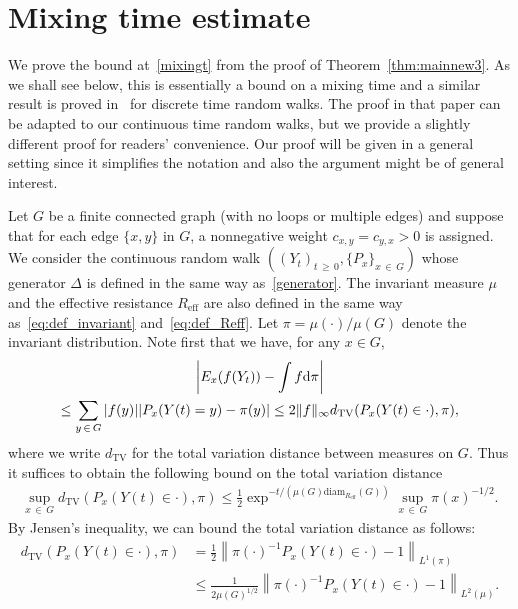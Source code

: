 \documentclass[AHL,Unicode,longabstracts,published]{cedram}
\newcommand{\dd}{\text{\upshape{d}}}
\begin{document}
\section{Mixing time estimate}\label{app:mixingt}

We prove the bound at~\eqref{mixingt} from the proof of Theorem~\ref{thm:mainnew3}. As we shall see below, this is essentially a bound on a mixing time and a similar result is proved in~\cite[Lemma~4.1, Corollary~4.2]{NP08} for discrete time random walks. The proof in that paper can be adapted to our continuous time random walks, but we provide a slightly different proof for readers' convenience. Our proof will be given in a general setting since it simplifies the notation and also the argument might be of general interest.

Let $G$ be a finite connected graph (with no loops or multiple edges) and suppose that for each edge $\{x,y\}$ in $G$, a nonnegative weight $c_{x,y}=c_{y,x}> 0$ is assigned. We consider the continuous random walk $((Y_t)_{t\,\ge\,0}, \{P_x\}_{x\,\in\,G})$ whose generator $\Delta$ is defined in the same way as~\eqref{generator}. The invariant measure $\mu$ and the effective resistance $R_{\text{eff}}$ are also defined in the same way as~\eqref{eq:def_invariant} and~\eqref{eq:def_Reff}. Let $\pi=\mu(\cdot)/\mu(G)$ denote the invariant distribution. Note first that we have, for any $x\in G$,
\begin{multline*}
\left|E_x(f(Y_t))-\int f \dd \pi\right| \\
\le \sum_{y\,\in\,G} |f(y)| |P_x(Y(t)=y)-\pi(y)|\le 2\|f\|_\infty d_{\text{TV}}(P_x(Y(t)\in\cdot),\pi),
\end{multline*}
where we write $d_{\text{TV}}$ for the total variation distance between measures on $G$. Thus it suffices to obtain the following bound on the total variation distance
\begin{align}\label{eq:TVgoal}
\sup_{x\,\in\,G}d_{\text{TV}}(P_x(Y(t)\in\cdot),\pi)
\le \frac{1}{2}\exp^{-t/\left(\mu(G)\text{diam}_{R_{\text{eff}}}(G)\right)}\sup_{x\,\in\,G}\pi(x)^{-1/2}.
\end{align}
By Jensen's inequality, we can bound the total variation distance as follows:
\begin{equation}\label{eq:L^1-L^2}
\begin{split}
d_{\text{TV}}(P_x(Y(t)\in\cdot),\pi) &=\frac{1}{2}\left\|\pi(\cdot)^{-1}P_x(Y(t)\in\cdot)-1\right\|_{L^1(\pi)}\\
&\le \frac{1}{2\mu(G)^{1/2}}\left\|\pi(\cdot)^{-1}P_x(Y(t)\in\cdot)-1\right\|_{L^2(\mu)}.
\end{split}
\end{equation}
\end{document}
